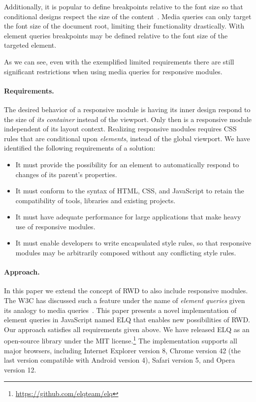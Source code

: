 \documentclass{llncs}
\newcommand{\elq}{ELQ}
\begin{document}
    Additionally, it is popular to define breakpoints relative to the font size so that conditional designs respect the size of the content~\cite{mq-em}.
    Media queries can only target the font size of the document root, limiting their functionality drastically.
    With element queries breakpoints may be defined relative to the font size of the targeted element.

    As we can see, even with the exemplified limited requirements there are still significant restrictions when using media queries for responsive modules.

  \paragraph{Requirements.}\label{sec:reqs}
    The desired behavior of a responsive module is having its inner design respond to the size of \emph{its container} instead of the viewport.
    Only then is a responsive module independent of its layout context.
    Realizing responsive modules requires CSS rules that are conditional upon \emph{elements}, instead of the global viewport.
    We have identified the following requirements of a solution:

    \begin{itemize}
      \item
        It must provide the possibility for an element to automatically respond to changes of its parent's properties.
      \item
        It must conform to the syntax of HTML, CSS, and JavaScript to retain the compatibility of tools, libraries and existing projects.
      \item
        It must have adequate performance for large applications that make heavy use of responsive modules.
      \item
        It must enable developers to write encapsulated style rules, so that responsive modules may be arbitrarily composed without any conflicting style rules.
    \end{itemize}
  \paragraph{Approach.}
    In this paper we extend the concept of RWD to also include responsive modules.
    The W3C has discussed such a feature under the name of \emph{element queries} given its analogy to media queries~\cite{w3c_eq_mail}.
    This paper presents a novel implementation of element queries in JavaScript named \elq{} that enables new possibilities of RWD.
    Our approach satisfies all requirements given above.
    We have released ELQ as an open-source library under the MIT license.\footnote{\url{https://github.com/elqteam/elq}}
    The implementation supports all major browsers, including Internet Explorer version 8, Chrome version 42 (the last version compatible with Android version 4), Safari version 5, and Opera version 12.
\end{document}
